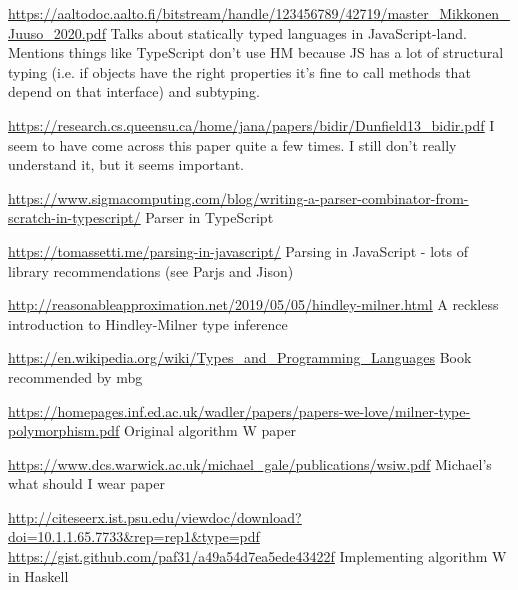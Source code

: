 \documentclass[a4paper,fleqn,12pt]{article}
\begin{document}
\underline{\href{https://aaltodoc.aalto.fi/bitstream/handle/123456789/42719/master\_Mikkonen\_Juuso\_2020.pdf}{https://aaltodoc.aalto.fi/bitstream/handle/123456789/42719/master\_Mikkonen\_Juuso\_2020.pdf}}
Talks about statically typed languages in JavaScript-land. Mentions things like TypeScript don’t use HM because JS has a lot of structural typing (i.e. if objects have the right properties it’s fine to call methods that depend on that interface) and subtyping.

\underline{\href{https://research.cs.queensu.ca/home/jana/papers/bidir/Dunfield13\_bidir.pdf}{https://research.cs.queensu.ca/home/jana/papers/bidir/Dunfield13\_bidir.pdf}}
I seem to have come across this paper quite a few times. I still don’t really understand it, but it seems important.

\underline{\href{https://www.sigmacomputing.com/blog/writing-a-parser-combinator-from-scratch-in-typescript/}{https://www.sigmacomputing.com/blog/writing-a-parser-combinator-from-scratch-in-typescript/}}
Parser in TypeScript

\underline{\href{https://tomassetti.me/parsing-in-javascript/}{https://tomassetti.me/parsing-in-javascript/}}
Parsing in JavaScript - lots of library recommendations (see Parjs and Jison)

\underline{\href{http://reasonableapproximation.net/2019/05/05/hindley-milner.html}{http://reasonableapproximation.net/2019/05/05/hindley-milner.html}}
A reckless introduction to Hindley-Milner type inference

\underline{\href{https://en.wikipedia.org/wiki/Types\_and\_Programming\_Languages}{https://en.wikipedia.org/wiki/Types\_and\_Programming\_Languages}}
Book recommended by mbg

\underline{\href{https://homepages.inf.ed.ac.uk/wadler/papers/papers-we-love/milner-type-polymorphism.pdf}{https://homepages.inf.ed.ac.uk/wadler/papers/papers-we-love/milner-type-polymorphism.pdf}}
Original algorithm W paper

\underline{\href{https://www.dcs.warwick.ac.uk/michael\_gale/publications/wsiw.pdf}{https://www.dcs.warwick.ac.uk/michael\_gale/publications/wsiw.pdf}}
Michael’s what should I wear paper

\underline{\href{http://citeseerx.ist.psu.edu/viewdoc/download?doi=10.1.1.65.7733\&rep=rep1\&type=pdf}{http://citeseerx.ist.psu.edu/viewdoc/download?doi=10.1.1.65.7733\&rep=rep1\&type=pdf}}
\underline{\href{https://gist.github.com/paf31/a49a54d7ea5ede43422f}{https://gist.github.com/paf31/a49a54d7ea5ede43422f}}
Implementing algorithm W in Haskell
\end{document}
